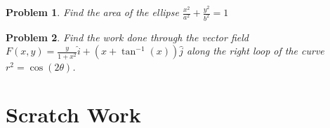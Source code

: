 \documentclass[11pt]{article}
\newtheorem{problem}{Problem}
\begin{document}
\vspace{9cm}

\begin{problem}
    Find the area of the ellipse $\frac{x^2}{a^2}+ \frac{y^2}{b^2} = 1$
\end{problem}


\vspace{9cm}

\begin{problem}
    Find the work done through the vector field $F(x,y) = \frac{y}{1+x^2}\hat{i} + (x+\tan^{-1}(x)) \hat{j}$ along the right loop of the curve $r^2 = \cos(2\theta)$.
\end{problem}


\newpage

\section{Scratch Work}
\end{document}
